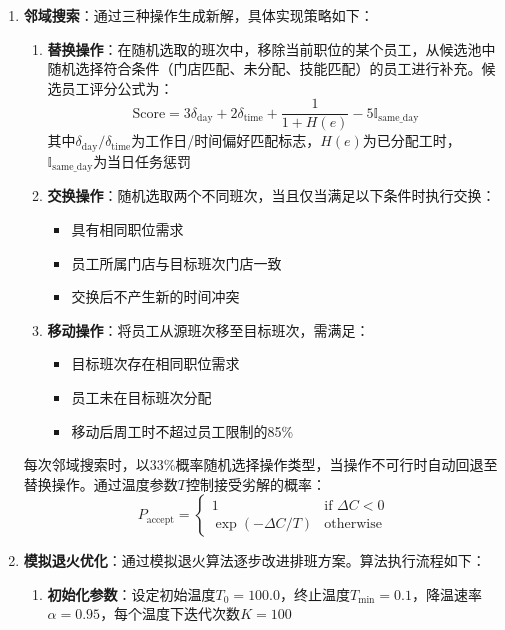 \documentclass{ctexart}
\begin{document}
\begin{enumerate}
    \item \textbf{邻域搜索}：通过三种操作生成新解，具体实现策略如下：
    \begin{enumerate}
        \item \textbf{替换操作}：在随机选取的班次中，移除当前职位的某个员工，从候选池中随机选择符合条件（门店匹配、未分配、技能匹配）的员工进行补充。候选员工评分公式为：
        \begin{equation}
        \text{Score} = 3\delta_{\text{day}} + 2\delta_{\text{time}} + \frac{1}{1+H(e)} - 5\mathbb{I}_{\text{same\_day}}
        \end{equation}
        其中$\delta_{\text{day}}/\delta_{\text{time}}$为工作日/时间偏好匹配标志，$H(e)$为已分配工时，$\mathbb{I}_{\text{same\_day}}$为当日任务惩罚
        
        \item \textbf{交换操作}：随机选取两个不同班次，当且仅当满足以下条件时执行交换：
        \begin{itemize}
            \item 具有相同职位需求
            \item 员工所属门店与目标班次门店一致
            \item 交换后不产生新的时间冲突
        \end{itemize}
        
        \item \textbf{移动操作}：将员工从源班次移至目标班次，需满足：
        \begin{itemize}
            \item 目标班次存在相同职位需求
            \item 员工未在目标班次分配
            \item 移动后周工时不超过员工限制的85\%
        \end{itemize}
    \end{enumerate}
    每次邻域搜索时，以33\%概率随机选择操作类型，当操作不可行时自动回退至替换操作。通过温度参数$T$控制接受劣解的概率：
    \begin{equation}
    P_{\text{accept}} = \begin{cases}
    1 & \text{if } \Delta C < 0 \\
    \exp(-\Delta C / T) & \text{otherwise}
    \end{cases}
    \end{equation}
    
    \item \textbf{模拟退火优化}：通过模拟退火算法逐步改进排班方案。算法执行流程如下：
    \begin{enumerate}
        \item \textbf{初始化参数}：设定初始温度$T_0=100.0$，终止温度$T_{\min}=0.1$，降温速率$\alpha=0.95$，每个温度下迭代次数$K=100$
        

\end{enumerate}
\end{enumerate}
\end{document}
